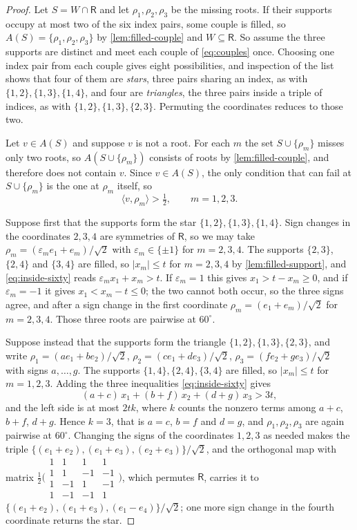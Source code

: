 \documentclass[10pt,a4paper]{amsart}
\newcommand{\Rt}{\mathsf{R}}                 %
\begin{document}
\begin{proof}
Let $S=W\cap\Rt$ and let $\rho_1,\rho_2,\rho_3$ be the missing roots. If
their supports occupy at most two of the six index pairs, some couple is
filled, so $A(S)=\{\rho_1,\rho_2,\rho_3\}$ by \cref{lem:filled-couple}
and $W\subseteq\Rt$. So assume the three supports are distinct and meet
each couple of \eqref{eq:couples} once. Choosing one index pair from each
couple gives eight possibilities, and inspection of the list shows that
four of them are \emph{stars}, three pairs sharing an index, as with
$\{1,2\},\{1,3\},\{1,4\}$, and four are \emph{triangles}, the three pairs
inside a triple of indices, as with $\{1,2\},\{1,3\},\{2,3\}$. Permuting
the coordinates reduces to those two.

Let $v\in A(S)$ and suppose $v$ is not a root. For each $m$ the set
$S\cup\{\rho_m\}$ misses only two roots, so $A(S\cup\{\rho_m\})$ consists
of roots by \cref{lem:filled-couple}, and therefore does not contain $v$.
Since $v\in A(S)$, the only condition that can fail at $S\cup\{\rho_m\}$
is the one at $\rho_m$ itself, so
\begin{equation}\label{eq:inside-sixty}
  \langle v,\rho_m\rangle>\tfrac12,\qquad m=1,2,3 .
\end{equation}

Suppose first that the supports form the star $\{1,2\},\{1,3\},\{1,4\}$.
Sign changes in the coordinates $2,3,4$ are symmetries of $\Rt$, so we
may take $\rho_m=(\varepsilon_me_1+e_m)/\sqrt2$ with
$\varepsilon_m\in\{\pm1\}$ for $m=2,3,4$. The supports $\{2,3\}$,
$\{2,4\}$ and $\{3,4\}$ are filled, so $|x_m|\le t$ for $m=2,3,4$ by
\cref{lem:filled-support}, and \eqref{eq:inside-sixty} reads
$\varepsilon_mx_1+x_m>t$. If $\varepsilon_m=1$ this gives
$x_1>t-x_m\ge0$, and if $\varepsilon_m=-1$ it gives $x_1<x_m-t\le0$; the
two cannot both occur, so the three signs agree, and after a sign change
in the first coordinate $\rho_m=(e_1+e_m)/\sqrt2$ for $m=2,3,4$. Those
three roots are pairwise at $60^\circ$.

Suppose instead that the supports form the triangle
$\{1,2\},\{1,3\},\{2,3\}$, and write
$\rho_1=(ae_1+be_2)/\sqrt2$, $\rho_2=(ce_1+de_3)/\sqrt2$,
$\rho_3=(fe_2+ge_3)/\sqrt2$ with signs $a,\dots,g$. The supports
$\{1,4\},\{2,4\},\{3,4\}$ are filled, so $|x_m|\le t$ for $m=1,2,3$.
Adding the three inequalities \eqref{eq:inside-sixty} gives
\[
  (a+c)\,x_1+(b+f)\,x_2+(d+g)\,x_3>3t ,
\]
and the left side is at most $2tk$, where $k$ counts the nonzero terms
among $a+c$, $b+f$, $d+g$. Hence $k=3$, that is $a=c$, $b=f$ and $d=g$,
and $\rho_1,\rho_2,\rho_3$ are again pairwise at $60^\circ$. Changing the
signs of the coordinates $1,2,3$ as needed makes the triple
$\{(e_1+e_2),(e_1+e_3),(e_2+e_3)\}/\sqrt2$, and the orthogonal map with
matrix $\tfrac12\bigl(\begin{smallmatrix}1&1&1&1\\1&1&-1&-1\\
1&-1&1&-1\\1&-1&-1&1\end{smallmatrix}\bigr)$, which permutes $\Rt$,
carries it to $\{(e_1+e_2),(e_1+e_3),(e_1-e_4)\}/\sqrt2$; one more sign
change in the fourth coordinate returns the star.


\end{proof}
\end{document}
